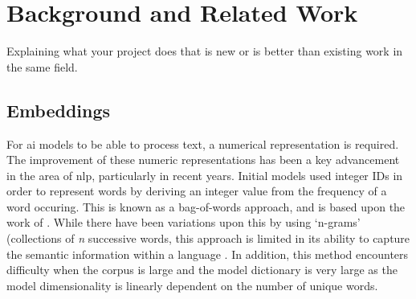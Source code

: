 \chapter{Background and Related Work}

\label{ch:background} 
\label{sec:background}


Explaining what your project does that is new or is better than existing work in the same field.

\section{Embeddings}
For \acrshort{ai} models to be able to process text, a numerical representation is required. The improvement of these numeric representations has been a key advancement in the area of \acrfull{nlp}, particularly in recent years. Initial models used integer IDs in order to represent words by deriving an integer value from the frequency of a word occuring. This is known as a bag-of-words approach, and is based upon the work of \citet{Zellig}. While there have been variations upon this by using `n-grams' (collections of \textit{n} successive words, this approach is limited in its ability to capture the semantic information within a language \citep{Monisha}. In addition, this method encounters difficulty when the corpus is large and the model dictionary is very large as the model dimensionality is linearly dependent on the number of unique words.

